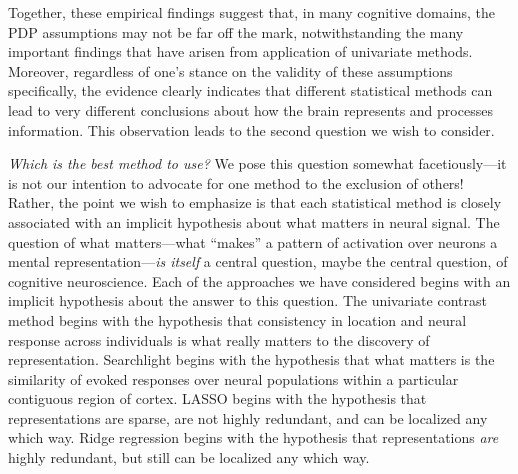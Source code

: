 Together, these empirical findings suggest that, in many cognitive domains, the PDP assumptions may not be far off the mark, notwithstanding the many important findings that have arisen from application of univariate methods. Moreover, regardless of one's stance on the validity of these assumptions specifically, the evidence clearly indicates that different statistical methods can lead to very different conclusions about how the brain represents and processes information. This observation leads to the second question we wish to consider.

{\em Which is the best method to use?} We pose this question somewhat facetiously---it is not our intention to advocate for one method to the exclusion of others! Rather, the point we wish to emphasize is that each statistical method is closely associated with an implicit hypothesis about what matters in neural signal. The question of what matters---what ``makes'' a pattern of activation over neurons a mental representation---{\em is itself} a central question, maybe the central question, of cognitive neuroscience. Each of the approaches we have considered begins with an implicit hypothesis about the answer to this question. The univariate contrast method begins with the hypothesis that consistency in location and neural response across individuals is what really matters to the discovery of representation. Searchlight begins with the hypothesis that what matters is the similarity of evoked responses over neural populations within a particular contiguous region of cortex. LASSO begins with the hypothesis that representations are sparse, are not highly redundant, and can be localized any which way. Ridge regression begins with the hypothesis that representations {\em are} highly redundant, but still can be localized any which way.

